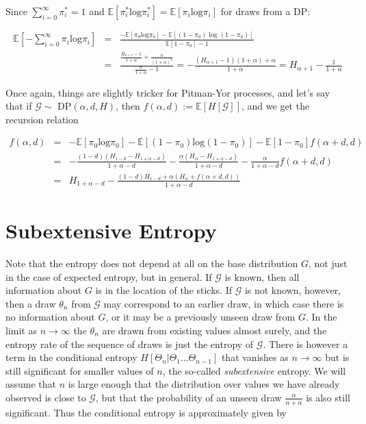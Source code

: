 \documentclass[11pt]{article}
\newcommand{\Log}{\mathrm{log}}
\newcommand{\E}{\mathbb{E}}
\newcommand{\G}{\mathcal{G}}
\begin{document}
Since $\sum_{i=0}^\infty \pi^*_i = 1$ and $\E[\pi^*_i\Log\pi^*_i] = \E[\pi_i\Log\pi_i]$ for draws from a DP:

\begin{eqnarray*}
\E\left[-\sum_{i=0}^\infty \pi_i\Log\pi_i\right] & = & \frac{-\E[\pi_0\Log\pi_0] - \E[(1-\pi_0)\log(1-\pi_0)]}{\E[1-\pi_0] - 1} \\
& = & \frac{\frac{H_{\alpha+1}-1}{1+\alpha}+\frac{\alpha}{(1+\alpha)^2}}{\frac{\alpha}{1+\alpha}-1} = -\frac{(H_{\alpha+1}-1)(1+\alpha)+\alpha}{1+\alpha} = H_{\alpha+1}-\frac{1}{1+\alpha}
\end{eqnarray*}

Once again, things are slightly tricker for Pitman-Yor processes, and let's say that if $\G \sim$ DP$(\alpha,d,H)$, then $f(\alpha,d) := \E[H[\G]]$, and we get the recursion relation

\begin{eqnarray*}
f(\alpha,d) & = & -\E[\pi_0\Log\pi_0] - \E[(1-\pi_0)\Log(1-\pi_0)]-\E[1-\pi_0]f(\alpha+d,d) \\
& = & -\frac{(1-d)(H_{1-d} - H_{1+\alpha-d})}{1+\alpha - d} - \frac{\alpha(H_{\alpha}-H_{1+\alpha-d})}{1+\alpha-d} - \frac{\alpha}{1+\alpha-d} f(\alpha+d,d) \\
& = & H_{1+\alpha-d} - \frac{(1-d)H_{1-d} + \alpha(H_\alpha+f(\alpha+d,d))}{1+\alpha-d}
\end{eqnarray*}

\section{Subextensive Entropy}

Note that the entropy does not depend at all on the base distribution $G$, not just in the case of expected entropy, but in general.  If $\G$ is known, then all information about $G$ is in the location of the sticks.  If $\G$ is not known, however, then a draw $\theta_n$ from $\G$ may correspond to an earlier draw, in which case there is no information about $G$, or it may be a previously unseen draw from $G$.  In the limit as $n \rightarrow \infty$ the $\theta_n$ are drawn from existing values almost surely, and the entropy rate of the sequence of draws is just the entropy of $\G$.  There is however a term in the conditional entropy $H[\Theta_n|\Theta_1\ldots\Theta_{n-1}]$ that vanishes as $n\rightarrow\infty$ but is still significant for smaller values of $n$, the so-called {\em subextensive} entropy.  We will assume that $n$ is large enough that the distribution over values we have already observed is close to $\G$, but that the probability of an unseen draw $\frac{\alpha}{n+\alpha}$ is also still significant.  Thus the conditional entropy is approximately given by 
\end{document}

